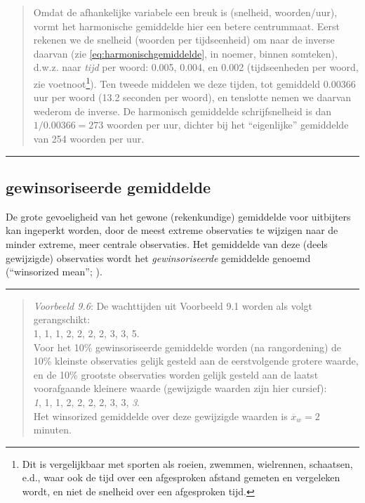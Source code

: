 \documentclass[
]{book}
\begin{document}
\begin{quote}
Omdat de afhankelijke variabele een breuk is (snelheid, woorden/uur),
vormt het harmonische gemiddelde hier een betere centrummaat. Eerst
rekenen we de snelheid (woorden per tijdseenheid) om naar de inverse
daarvan (zie \eqref{eq:harmonischgemiddelde}, in noemer, binnen somteken),
d.w.z. naar \emph{tijd} per woord: 0.005, 0.004, en 0.002 (tijdseenheden per
woord, zie voetnoot\footnote{Dit is vergelijkbaar met sporten als roeien, zwemmen, wielrennen, schaatsen, e.d., waar ook de tijd over een afgesproken afstand gemeten en vergeleken wordt, en niet de snelheid over een afgesproken tijd.}). Ten tweede middelen we deze tijden, tot
gemiddeld 0.00366 uur per woord (13.2 seconden per woord), en tenslotte nemen we daarvan wederom
de inverse. De harmonisch gemiddelde schrijfsnelheid is dan \(1/0.00366=273\)
woorden per uur, dichter bij het ``eigenlijke'' gemiddelde van 254 woorden
per uur.
\end{quote}

\begin{center}\rule{0.5\linewidth}{0.5pt}\end{center}

\subsection{gewinsoriseerde gemiddelde}\label{gewinsoriseerde-gemiddelde}

De grote gevoeligheid van het gewone (rekenkundige) gemiddelde voor
uitbijters kan ingeperkt worden, door de meest extreme observaties te
wijzigen naar de minder extreme, meer centrale observaties. Het
gemiddelde van deze (deels gewijzigde) observaties wordt het
\emph{gewinsoriseerde} gemiddelde genoemd (``winsorized mean''; ).

\begin{center}\rule{0.5\linewidth}{0.5pt}\end{center}

\begin{quote}
\emph{Voorbeeld 9.6}: De wachttijden uit Voorbeeld 9.1
worden als volgt gerangschikt:\\
1, 1, 1, 2, 2, 2, 2, 3, 3, 5.\\
Voor het 10\% gewinsoriseerde gemiddelde worden (na rangordening) de 10\%
kleinste observaties gelijk gesteld aan de eerstvolgende grotere waarde,
en de 10\% grootste observaties worden gelijk gesteld aan de laatst
voorafgaande kleinere waarde (gewijzigde waarden zijn hier cursief):\\
\emph{1}, 1, 1, 2, 2, 2, 2, 3, 3, \emph{3}.\\
Het winsorized gemiddelde over deze gewijzigde waarden is
\(\overline{x}_w=2\) minuten.
\end{quote}
\end{document}
